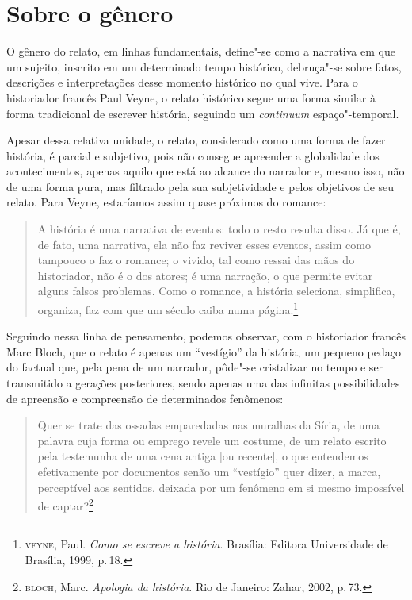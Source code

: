 \section{Sobre o gênero}

O gênero do relato, em linhas fundamentais, define"-se como a narrativa em que um sujeito, inscrito em um determinado tempo histórico, debruça"-se sobre fatos, descrições e interpretações desse momento histórico no qual vive. Para o historiador francês Paul Veyne, o relato histórico segue uma forma similar à forma tradicional de escrever história, seguindo um \textit{continuum} espaço"-temporal.

Apesar dessa relativa unidade, o relato, considerado como uma forma de fazer história,
é parcial e subjetivo, pois não consegue apreender a globalidade dos acontecimentos, apenas
aquilo que está ao alcance do narrador e, mesmo isso, não de uma forma pura, mas filtrado pela sua subjetividade e pelos objetivos de seu relato.
Para Veyne, estaríamos assim quase próximos do romance:

\begin{quote}
A história é uma narrativa de eventos: todo o resto resulta disso. Já que é, de fato, uma narrativa, ela não faz reviver esses eventos, assim como tampouco o faz o romance; o vivido, tal como ressai das mãos do historiador, não é o dos atores; é uma narração,
o que permite evitar alguns falsos problemas. Como o romance, a
história seleciona, simplifica, organiza, faz com que um século
caiba numa página.\footnote{\textsc{veyne}, Paul. \textit{Como se escreve a história}. Brasília: Editora Universidade de Brasília, 1999, p.\,18.}
\end{quote}

Seguindo nessa linha de pensamento, podemos observar, com o historiador francês Marc Bloch, que o relato é apenas um ``vestígio'' da história, um pequeno pedaço do factual que, pela pena de um narrador, pôde"-se cristalizar no tempo e ser transmitido a gerações posteriores, sendo apenas uma das infinitas possibilidades de apreensão e compreensão de determinados fenômenos:

\begin{quote}
Quer se trate das ossadas
emparedadas nas muralhas da Síria, de uma palavra cuja forma ou emprego revele um
costume, de um relato escrito pela testemunha de uma cena antiga [ou recente], o que
entendemos efetivamente por documentos senão um ``vestígio'' quer dizer, a marca,
perceptível aos sentidos, deixada por um fenômeno em si mesmo impossível de captar?\footnote{\textsc{bloch}, Marc. \textit{Apologia da história}. Rio de Janeiro: Zahar, 2002, p.\,73.}
\end{quote}

